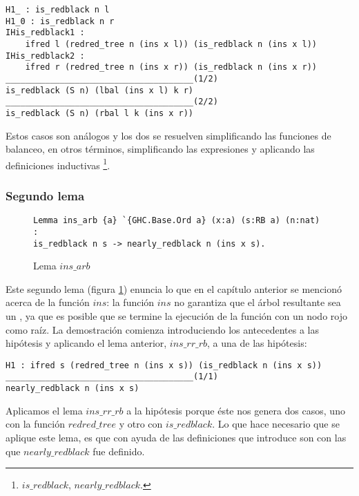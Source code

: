\begin{verbatim}
H1_ : is_redblack n l
H1_0 : is_redblack n r
IHis_redblack1 :
    ifred l (redred_tree n (ins x l)) (is_redblack n (ins x l))
IHis_redblack2 :
    ifred r (redred_tree n (ins x r)) (is_redblack n (ins x r))
______________________________________(1/2)
is_redblack (S n) (lbal (ins x l) k r)
______________________________________(2/2)
is_redblack (S n) (rbal l k (ins x r))
\end{verbatim}

Estos casos son análogos y los dos se resuelven simplificando las funciones de balanceo, en otros 
términos, simplificando las expresiones y aplicando las definiciones inductivas 
\footnote{\hyperref[inductive_isRedB]{$is\_redblack$}, 
\hyperref[inductive_isRedB]{$nearly\_redblack$}.}.

\subsubsection{Segundo lema}

\begin{figure}[!ht]
\centering
\captionsetup{justification=centering}
\begin{verbatim}
Lemma ins_arb {a} `{GHC.Base.Ord a} (x:a) (s:RB a) (n:nat) :
is_redblack n s -> nearly_redblack n (ins x s).
\end{verbatim}
\caption{Lema $ins\_arb$}
\label{lema_2}
\end{figure}

Este segundo lema (figura \ref{lema_2}) enuncia lo que en el cap\'itulo anterior se mencion\'o acerca
de la funci\'on \hyperref[func_ins]{$ins$}: la funci\'on \hyperref[func_ins]{$ins$} no garantiza que 
el \'arbol resultante sea un {\arn}, ya que es posible que se termine la ejecuci\'on de la funci\'on 
con un nodo rojo como raíz. La demostraci\'on comienza introduciendo los antecedentes a las 
hipótesis y aplicando el lema anterior, \hyperref[lema_1]{$ins\_rr\_rb$}, a una de las hip\'otesis:

\begin{verbatim}
H1 : ifred s (redred_tree n (ins x s)) (is_redblack n (ins x s))
______________________________________(1/1)
nearly_redblack n (ins x s)

\end{verbatim}

Aplicamos el lema \hyperref[lema_1]{$ins\_rr\_rb$} a la hip\'otesis porque \'este nos genera dos 
casos, uno con la funci\'on \hyperref[inductive_isRedB]{$redred\_tree$} y otro con 
\hyperref[inductive_isRedB]{$is\_redblack$}. Lo que hace necesario que se aplique este lema, es que 
con ayuda de las definiciones que introduce son con las que 
\hyperref[inductive_isRedB]{$nearly\_redblack$} fue definido.


